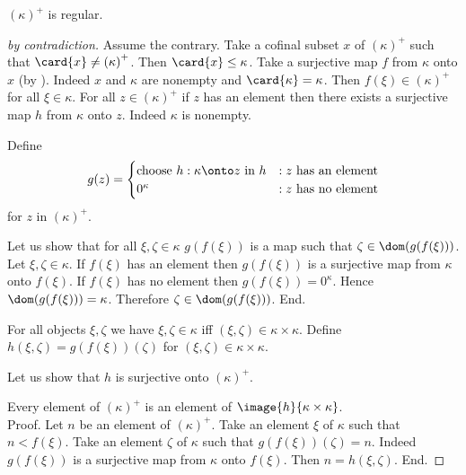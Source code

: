 \documentclass{stex}
\newcommand{\constzero}[1]{0^{#1}}
\newcommand{\cardsucc}[1]{\left(#1\right)^{+}}
\begin{document}
  \begin{forthel}
    \begin{theorem*}[Hausdorff]
      $\cardsucc{\kappa}$ is regular.
    \end{theorem*}
    \begin{proof}[by contradiction]
      Assume the contrary.
      Take a cofinal subset $x$ of $\cardsucc{\kappa}$ such that $\card{x} \neq \cardsucc{\kappa}$.
      Then $\card{x} \leq \kappa$.
      Take a surjective map $f$ from $\kappa$ onto $x$
      (by ).
      Indeed $x$ and $\kappa$ are nonempty and $\card{\kappa} = \kappa$.
      Then $f(\xi) \in \cardsucc{\kappa}$ for all $\xi \in \kappa$.
      For all $z \in \cardsucc{\kappa}$ if $z$ has an element then there exists a
      surjective map $h$ from $\kappa$ onto $z$.
      Indeed $\kappa$ is nonempty.

      Define \[ g(z) =
        \begin{cases}
          \text{choose $h : \kappa \onto z$ in $h$}
          & : \text{$z$ has an element}
          \\
          \text{$\constzero{\kappa}$}
          & : \text{$z$ has no element}
        \end{cases}
      \] for $z$ in $\cardsucc{\kappa}$.

      Let us show that for all $\xi, \zeta \in \kappa$ $g(f(\xi))$ is a map such
      that $\zeta \in \dom(g(f(\xi)))$.
        Let $\xi, \zeta \in \kappa$.
        If $f(\xi)$ has an element then $g(f(\xi))$ is a surjective map from
        $\kappa$ onto $f(\xi)$.
        If $f(\xi)$ has no element then $g(f(\xi)) = \constzero{\kappa}$.
        Hence $\dom(g(f(\xi))) = \kappa$.
        Therefore $\zeta \in \dom(g(f(\xi)))$.
      End.

      For all objects $\xi, \zeta$ we have $\xi, \zeta \in \kappa$ iff
      $(\xi, \zeta) \in \kappa \times \kappa$.
      Define $h(\xi,\zeta) = g(f(\xi))(\zeta)$ for $(\xi,\zeta) \in \kappa
      \times \kappa$.

      Let us show that $h$ is surjective onto $\cardsucc{\kappa}$.

        Every element of $\cardsucc{\kappa}$ is an element of $\image{h}{\kappa \times \kappa}$. \\
        Proof.
          Let $n$ be an element of $\cardsucc{\kappa}$.
          Take an element $\xi$ of $\kappa$ such that $n \less f(\xi)$.
          Take an element $\zeta$ of $\kappa$ such that $g(f(\xi))(\zeta) = n$.
          Indeed $g(f(\xi))$ is a surjective map from $\kappa$ onto $f(\xi)$.
          Then $n = h(\xi,\zeta)$.
        End.


\end{proof}
\end{forthel}
\end{document}
